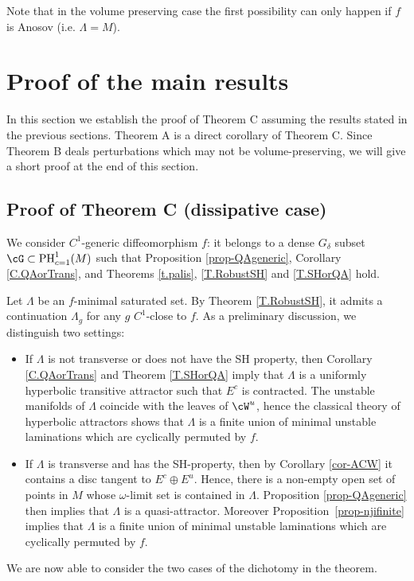 \documentclass[a4paper,11pt]{amsart}
\numberwithin{equation}{section}     %
\theoremstyle{definition}
\theoremstyle{remark}
\DeclareMathOperator{\PH}{PH}
\begin{document}
Note that in the volume preserving case the first possibility can only happen if $f$ is Anosov (i.e. $\Lambda=M$). 


\section{Proof of the main results}\label{s.proofsAB}

In this section we establish the proof of Theorem C assuming the results stated in the previous sections.
Theorem A is a direct corollary of Theorem C.
Since Theorem B deals perturbations which may not be volume-preserving, we will give a short proof at the end of this section. 

\subsection{Proof of Theorem C (dissipative case)} \label{ss.dissipative}
We consider $C^1$-generic diffeomorphism $f$: it belongs to a dense $G_\delta$ subset $\cG \subset \PH^1_{c=1}(M)$ such that Proposition \ref{prop-QAgeneric},  Corollary \ref{C.QAorTrans}, and Theorems \ref{t.palis}, \ref{T.RobustSH} and \ref{T.SHorQA} hold. 

Let $\Lambda$ be an $f$-minimal saturated set. By Theorem \ref{T.RobustSH}, it admits a continuation $\Lambda_g$ for any $g$ $C^1$-close to $f$. As a preliminary discussion, we distinguish two settings:
\begin{itemize}
\item If $\Lambda$ is not transverse or does not have the SH property, then Corollary \ref{C.QAorTrans} and Theorem \ref{T.SHorQA} imply that $\Lambda$ is a uniformly hyperbolic transitive attractor such that $E^c$ is contracted.
The unstable manifolds of $\Lambda$ coincide with the leaves of $\cW^u$, hence the classical theory of hyperbolic attractors shows that $\Lambda$ is a finite union of minimal unstable laminations which are cyclically permuted by $f$.
\item If $\Lambda$ is transverse and has the SH-property, then by Corollary \ref{cor-ACW} it contains a disc tangent to $E^c \oplus E^u$. Hence, there is a non-empty open set of points in $M$ whose $\omega$-limit set is contained in $\Lambda$. Proposition \ref{prop-QAgeneric} then implies that $\Lambda$ is a quasi-attractor.
Moreover Proposition~\ref{prop-njifinite} implies that $\Lambda$ is a finite union of minimal unstable laminations which are cyclically permuted by $f$.
\end{itemize}
We are now able to consider the two cases of the dichotomy in the theorem.
\medskip
\end{document}
